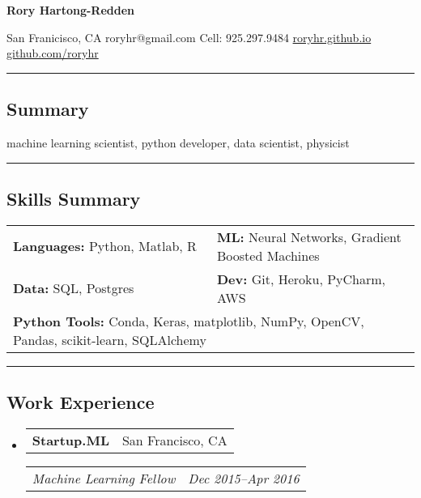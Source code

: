 \documentclass[10pt,letterpaper]{article}
\makeatletter
\newenvironment{indentsection}[1]%
{\begin{list}{}%
	{\setlength{\leftmargin}{#1}}%
	\item[]%
}
{\end{list}}
\newcommand{\headerrow}[2]
{\begin{tabular*}{\linewidth}{l@{\extracolsep{\fill}}r}
	#1 &
	#2 \\
\end{tabular*}}
\makeatother
\begin{document}
{\raggedright \LARGE \bf Rory Hartong-Redden\\}

{\raggedleft 
San Franicisco, CA \textbar\/ 
roryhr@gmail.com \textbar\/ 
Cell: 925.297.9484 \textbar\/ 
\href{roryhr.github.io}{roryhr.github.io} \textbar\/   
\href{https://github.com/roryhr}{github.com/roryhr}\\}
\hrule

\subsection*{Summary}
\begin{centering}  
machine learning scientist, python developer, data scientist, physicist\\
\end{centering}

\hrule
\subsection*{Skills Summary}
\begin{indentsection}{\parindent}
\begin{tabular}{p{0.5\linewidth}   p{0.5\linewidth} } 
	\textbf{Languages:}  Python, Matlab, R	
	& \textbf{ML:} Neural Networks, Gradient Boosted Machines \\

	\textbf{Data:} SQL, Postgres
		& \textbf{Dev:}  Git, Heroku, PyCharm, AWS \\  
	
	\multicolumn{2}{l}{\textbf{Python Tools:} Conda, Keras, matplotlib, NumPy, OpenCV, Pandas, scikit-learn, SQLAlchemy} \\
\end{tabular}
\end{indentsection}

\hrule
\subsection*{Work Experience}
\begin{itemize}
	\parskip=-0.1em
	\item
	\headerrow
		{\textbf{Startup.ML}}
		{San Francisco, CA}
	\headerrow
		{\emph{Machine Learning Fellow}}
		{\emph{Dec 2015--Apr 2016}}
\end{itemize}
\end{document}
